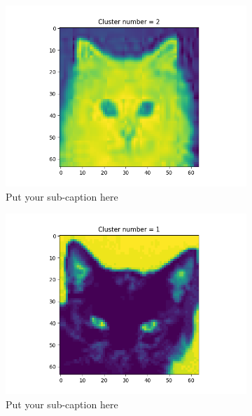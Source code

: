 \documentclass{article}
\begin{document}
\begin{figure}[ht]
\begin{subfigure}{.33\textwidth}
  \centering
  \includegraphics[width=1\linewidth]{1d/Cats/example clust 2.png}  
  \caption{Put your sub-caption here}
  \label{fig:sub-first}
\end{subfigure}
\begin{subfigure}{.33\textwidth}
  \centering
  \includegraphics[width=1\linewidth]{1d/Cats/example clust 1.png}  
  \caption{Put your sub-caption here}
  \label{fig:sub-second}
\end{subfigure}
\begin{subfigure}{.33\textwidth}
  \centering

\end{subfigure}
\end{figure}
\end{document}

